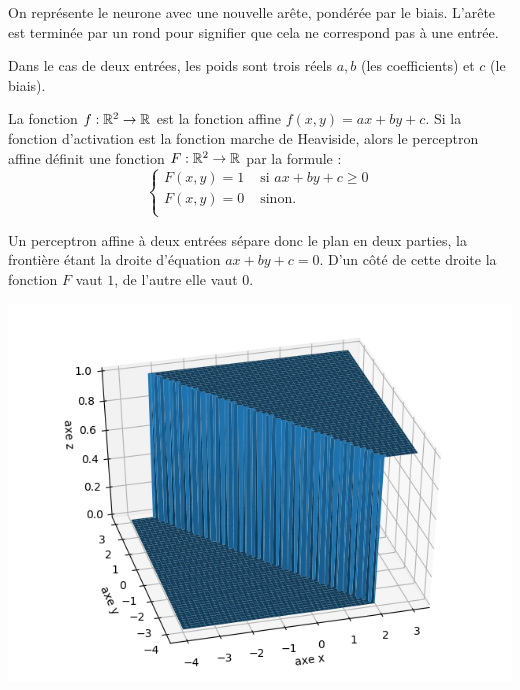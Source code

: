 
On représente le neurone avec une nouvelle arête, pondérée par le biais. L'arête  est terminée par un rond pour signifier que cela ne correspond pas à une entrée.



Dans le cas de deux entrées, les poids sont trois réels $a,b$ (les coefficients) et $c$ (le biais).

La fonction $f : \mathbb{R}^2 \to \mathbb{R}$ est la fonction affine $f(x,y) =ax+by+c$.
Si la fonction d'activation est la fonction marche de Heaviside, alors le perceptron affine définit une fonction $F : \mathbb{R}^2 \to \mathbb{R}$ par la formule :
$$\begin{cases}
	F(x,y) = 1 & \text{ si } ax+by+c \ge 0 \\
	F(x,y) = 0  & \text{ sinon.} \\
\end{cases}$$


Un perceptron affine à deux entrées sépare donc le plan en deux parties, la frontière étant la droite d'équation $ax+by+c=0$.
D'un côté de cette droite la fonction $F$ vaut $1$, de l'autre elle vaut $0$.


\begin{center}
	\includegraphics[scale=\myscale,scale=0.7]{figures/neurones-surface-4}
\end{center}



